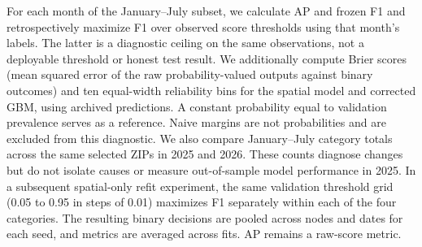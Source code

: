 \documentclass[conference]{IEEEtran}
\begin{document}
For each month of the January--July subset, we calculate AP and frozen F1 and retrospectively maximize F1 over observed score thresholds using that month's labels. The latter is a diagnostic ceiling on the same observations, not a deployable threshold or honest test result. We additionally compute Brier scores (mean squared error of the raw probability-valued outputs against binary outcomes) and ten equal-width reliability bins for the spatial model and corrected GBM, using archived predictions. A constant probability equal to validation prevalence serves as a reference. Naive margins are not probabilities and are excluded from this diagnostic. We also compare January--July category totals across the same selected ZIPs in 2025 and 2026. These counts diagnose changes but do not isolate causes or measure out-of-sample model performance in 2025. In a subsequent spatial-only refit experiment, the same validation threshold grid (0.05 to 0.95 in steps of 0.01) maximizes F1 separately within each of the four categories. The resulting binary decisions are pooled across nodes and dates for each seed, and metrics are averaged across fits. AP remains a raw-score metric.
\end{document}
